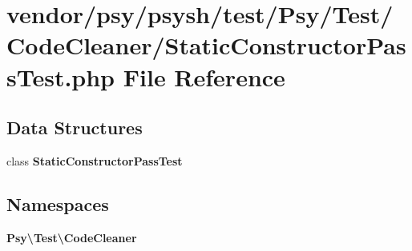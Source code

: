 \section{vendor/psy/psysh/test/\+Psy/\+Test/\+Code\+Cleaner/\+Static\+Constructor\+Pass\+Test.php File Reference}
\label{_static_constructor_pass_test_8php}
\subsection*{Data Structures}
\begin{DoxyCompactItemize}
\item 
class {\bf Static\+Constructor\+Pass\+Test}
\end{DoxyCompactItemize}
\subsection*{Namespaces}
\begin{DoxyCompactItemize}
\item 
 {\bf Psy\textbackslash{}\+Test\textbackslash{}\+Code\+Cleaner}
\end{DoxyCompactItemize}
